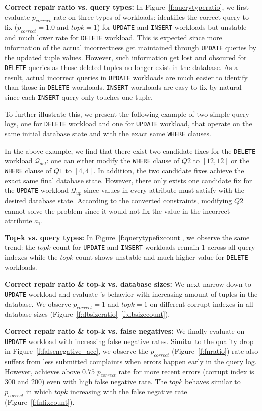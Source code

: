 \textbf{Correct repair ratio vs. query types: } In Figure~\ref{f:querytyperatio}, we first evaluate $p_{correct}$ rate on three types of workloads: \sys identifies the correct query to fix ($p_{correct} = 1.0$ and $topk = 1$) for \texttt{UPDATE} and \texttt{INSERT} workloads but unstable and much lower rate for \texttt{DELETE} workload. This is expected since more information of the actual incorrectness get maintained through \texttt{UPDATE} queries by the updated tuple values. However, such information get lost and obscured for \texttt{DELETE} queries as those deleted tuples no longer exist in the database. As a result, actual incorrect queries in \texttt{UPDATE} workloads are much easier to identify than those in \texttt{DELETE} workloads. \texttt{INSERT} workloads are easy to fix by natural since each \texttt{INSERT} query only touches one tuple. 

To further illustrate this, we present the following example of two simple query logs, one for \texttt{DELETE} workload and one for \texttt{UPDATE} workload, that operate on the same initial database state and with the exact same \texttt{WHERE} clauses. 

In the above example, we find that there exist two candidate fixes for the \texttt{DELETE} workload $\mathcal{Q}_{del}$: one can either modify the \texttt{WHERE} clause of $Q2$ to $[12, 12]$ or the \texttt{WHERE} clause of $Q1$ to $[4, 4]$. In addition, the two candidate fixes achieve the exact same final database state. However, there only exists one candidate fix for the \texttt{UPDATE} workload $\mathcal{Q}_{up}$ since values in every attribute must satisfy with the desired database state. According to the converted constraints, modifying $Q2$ cannot solve the problem since it would not fix the value in the incorrect attribute $a_1$.  

\textbf{Top-k vs. query types: } In Figure~\ref{f:querytypefixcount}, we observe the same trend: the $topk$ count for \texttt{UPDATE} and \texttt{INSERT} workloads remain $1$ across all query indexes while the $topk$ count shows unstable and much higher value for \texttt{DELETE} workloads. 


\textbf{Correct repair ratio \& top-k vs. database sizes: } We next narrow down to \texttt{UPDATE} workload and evaluate \sys's behavior with increasing amount of tuples in the database. We observe $p_{correct} = 1$ and $topk = 1$ on different corrupt indexes in all database sizes (Figure~\ref{f:dbsizeratio}~\ref{f:dbsizecount}). 

\textbf{Correct repair ratio \& top-k vs. false negatives: } We finally evaluate \sys on \texttt{UPDATE} workload with increasing false negative rates. Similar to the quality drop in Figure~\ref{f:falsenegative_acc}, we observe the $p_{correct}$ (Figure~\ref{f:fnratio}) rate also suffers from less submitted complaints when errors happen early in the query log. However, \sys achieves above $0.75$ $p_{correct}$ rate for more recent errors (corrupt index is 300 and 200) even with high false negative rate. The $topk$ behaves similar to $p_{correct}$ in which $topk$ increasing with the false negative rate (Figure~\ref{f:fnfixcount}).  